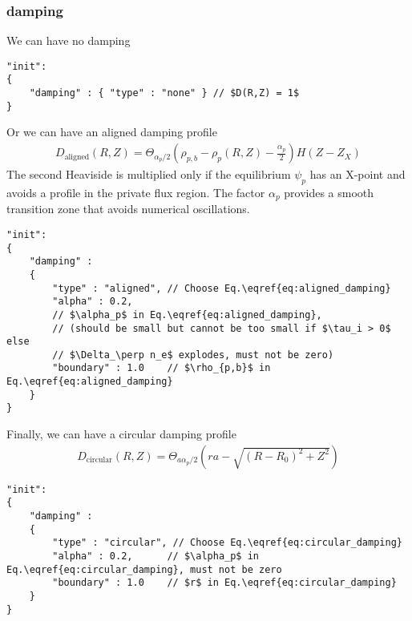 \subsubsection{damping} \label{sec:damping}
We can have no damping
\begin{verbatim}
"init":
{
    "damping" : { "type" : "none" } // $D(R,Z) = 1$
}
\end{verbatim}
Or we can have an aligned damping profile
\begin{align} \label{eq:aligned_damping}
    D_\mathrm{aligned}(R,Z)=\Theta_{\alpha_p/2}\left(\rho_{p,b}-\rho_p(R, Z)-\frac{\alpha_p}{2}\right) H(Z-Z_X)
\end{align}
The second Heaviside is multiplied only if the equilibrium $\psi_p$ has an
X-point and avoids a profile in the private flux region. The factor $\alpha_p$ provides a smooth transition
zone that avoids numerical oscillations.
\begin{verbatim}
"init":
{
    "damping" :
    {
        "type" : "aligned", // Choose Eq.\eqref{eq:aligned_damping}
        "alpha" : 0.2,
        // $\alpha_p$ in Eq.\eqref{eq:aligned_damping},
        // (should be small but cannot be too small if $\tau_i > 0$ else
        // $\Delta_\perp n_e$ explodes, must not be zero)
        "boundary" : 1.0    // $\rho_{p,b}$ in Eq.\eqref{eq:aligned_damping}
    }
}
\end{verbatim}
Finally, we can have a circular damping profile
\begin{align} \label{eq:circular_damping}
    D_\mathrm{circular}(R,Z) = \Theta_{ a \alpha_p/2}\left( r a- \sqrt{(R-R_0)^2 + Z^2}\right)
\end{align}
\begin{verbatim}
"init":
{
    "damping" :
    {
        "type" : "circular", // Choose Eq.\eqref{eq:circular_damping}
        "alpha" : 0.2,      // $\alpha_p$ in Eq.\eqref{eq:circular_damping}, must not be zero
        "boundary" : 1.0    // $r$ in Eq.\eqref{eq:circular_damping}
    }
}
\end{verbatim}

